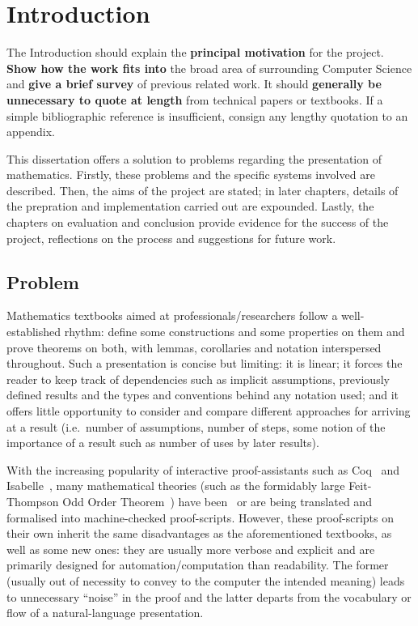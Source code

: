 \chapter{Introduction}

{\sf \color{red}
  The Introduction should explain the \textbf{principal motivation} for the
  project.  \textbf{Show how the work fits into} the broad area of surrounding
  Computer Science and \textbf{give a brief survey} of previous related work.
  It should \textbf{generally be unnecessary to quote at length} from technical
  papers or textbooks. If a simple bibliographic reference is insufficient,
  consign any lengthy quotation to an appendix.
}

This dissertation offers a solution to problems regarding the presentation of
mathematics. Firstly, these problems and the specific systems involved are
described. Then, the aims of the project are stated; in later chapters, details
of the prepration and implementation carried out are expounded. Lastly, the
chapters on evaluation and conclusion provide evidence for the success of the
project, reflections on the process and suggestions for future work.

\section{Problem}

Mathematics textbooks aimed at professionals/researchers follow a well-established
rhythm: define some constructions and some properties on them and prove
theorems on both, with lemmas, corollaries and notation interspersed
throughout. Such a presentation is concise but limiting: it is linear; it forces
the reader to keep track of dependencies such as implicit assumptions, previously
defined results and the types and conventions behind any notation used;
and it offers little opportunity to consider and compare different approaches
for arriving at a result (i.e.\ number of assumptions, number of steps, some
notion of the importance of a result such as number of uses by later
results).

With the increasing popularity of interactive proof-assistants such as
Coq~\cite{Coq:manual} and Isabelle~\cite{nipkow2002isabelle}, many mathematical
theories (such as the formidably large Feit-Thompson Odd Order
Theorem~\cite{peterfalvi2000oot, bender1994oot}) have
been~\cite{gonthier2013oot} or are being translated and formalised into
machine-checked proof-scripts. However, these proof-scripts on their own
inherit the same disadvantages as the aforementioned textbooks, as well as some
new ones: they are usually more verbose and explicit and are primarily designed
for automation/computation than readability. The former (usually out of
necessity to convey to the computer the intended meaning) leads to unnecessary
``noise'' in the proof and the latter departs from the vocabulary or flow of a
natural-language presentation.

